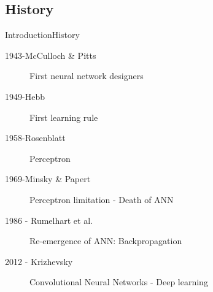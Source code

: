 \documentclass[10pt,compress]{beamer} %
\begin{document}



\subsection{History}
\begin{frame}{Introduction}{History}
	\begin{description}
	\item[1943-McCulloch \& Pitts] First neural network designers
	\item[1949-Hebb] First learning rule
	\item[1958-Rosenblatt] Perceptron
	\item[1969-Minsky \& Papert]  Perceptron limitation - Death of ANN
	\item[1986 - Rumelhart et al.] Re-emergence of ANN: Backpropagation
	\item[2012 - Krizhevsky] Convolutional Neural Networks - Deep learning
	\end{description}
\end{frame}
\end{document}
